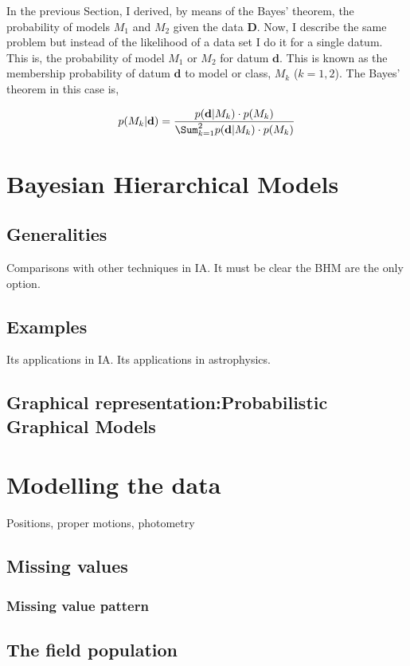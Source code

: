 In the previous Section, I derived, by means of the Bayes' theorem, the probability of models $M_1$ and $M_2$ given the data $\mathbf{D}$. Now, I describe the same problem but instead of the likelihood of a data set I do it for a single datum. This is, the probability of model $M_1$ or $M_2$ for datum $\mathbf{d}$. This is known as the membership probability of datum $\mathbf{d}$ to model or class, $M_k$ ($k=1,2$). The Bayes' theorem in this case is,

\begin{equation}
p( M_k | \mathbf{d}) =\frac{p(\mathbf{d}|M_k)\cdot p(M_k)}{\Sum_{k=1}^2 p(\mathbf{d}|M_k)\cdot p(M_k)} 
\end{equation}





\section{Bayesian Hierarchical Models}
\subsection{Generalities}
Comparisons with other techniques in IA.
It must be clear the BHM are the only option.
\subsection{Examples}
Its applications in IA.
Its applications in astrophysics.
\subsection{Graphical representation:Probabilistic Graphical Models}

\section{Modelling the data}
Positions, proper motions, photometry
\subsection{Missing values}
\subsubsection{Missing value pattern}
\subsection{The field population}
